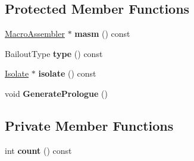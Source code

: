 \subsection*{Protected Member Functions}
\begin{DoxyCompactItemize}
\item 
\hyperlink{classv8_1_1internal_1_1_macro_assembler}{Macro\+Assembler} $\ast$ {\bfseries masm} () const \hypertarget{classv8_1_1internal_1_1_deoptimizer_1_1_b_a_s_e___e_m_b_e_d_d_e_d_ae11d3fa7d6c126b35985e6da88818b4a}{}\label{classv8_1_1internal_1_1_deoptimizer_1_1_b_a_s_e___e_m_b_e_d_d_e_d_ae11d3fa7d6c126b35985e6da88818b4a}

\item 
Bailout\+Type {\bfseries type} () const \hypertarget{classv8_1_1internal_1_1_deoptimizer_1_1_b_a_s_e___e_m_b_e_d_d_e_d_a1ee53b32318046535c5d383eb719001e}{}\label{classv8_1_1internal_1_1_deoptimizer_1_1_b_a_s_e___e_m_b_e_d_d_e_d_a1ee53b32318046535c5d383eb719001e}

\item 
\hyperlink{classv8_1_1internal_1_1_isolate}{Isolate} $\ast$ {\bfseries isolate} () const \hypertarget{classv8_1_1internal_1_1_deoptimizer_1_1_b_a_s_e___e_m_b_e_d_d_e_d_a2e1b1ebd94291e1b8d890a3079a79dc3}{}\label{classv8_1_1internal_1_1_deoptimizer_1_1_b_a_s_e___e_m_b_e_d_d_e_d_a2e1b1ebd94291e1b8d890a3079a79dc3}

\item 
void {\bfseries Generate\+Prologue} ()\hypertarget{classv8_1_1internal_1_1_deoptimizer_1_1_b_a_s_e___e_m_b_e_d_d_e_d_a37c57fe414443d7e0a1b26d2052860dc}{}\label{classv8_1_1internal_1_1_deoptimizer_1_1_b_a_s_e___e_m_b_e_d_d_e_d_a37c57fe414443d7e0a1b26d2052860dc}

\end{DoxyCompactItemize}
\subsection*{Private Member Functions}
\begin{DoxyCompactItemize}
\item 
int {\bfseries count} () const \hypertarget{classv8_1_1internal_1_1_deoptimizer_1_1_b_a_s_e___e_m_b_e_d_d_e_d_aeeb8dd10ac0ff6e28d9bb24f3a3bfadc}{}\label{classv8_1_1internal_1_1_deoptimizer_1_1_b_a_s_e___e_m_b_e_d_d_e_d_aeeb8dd10ac0ff6e28d9bb24f3a3bfadc}

\end{DoxyCompactItemize}
